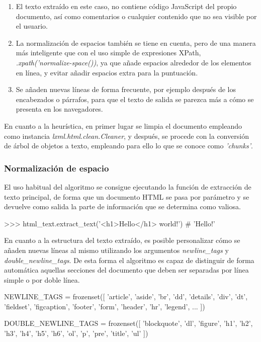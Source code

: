 \begin{enumerate}
  \item El texto extraído en este caso, no contiene código JavaScript del propio documento, así como 
  comentarios o cualquier contenido que no sea visible por el usuario.
  \item La normalización de espacios también se tiene en cuenta, pero de una manera más inteligente que
  con el uso simple de expresiones XPath, \emph{.xpath('normalize-space())}, ya que añade espacios alrededor
  de los elementos en línea, y evitar añadir espacios extra para la puntuación.
  \item Se añaden nuevas líneas de forma frecuente, por ejemplo después de los encabezados o párrafos, para 
  que el texto de salida se parezca más a cómo se presenta en los navegadores.
\end{enumerate}

En cuanto a la heurística, en primer lugar se limpia el documento empleando como instancia
\emph{lxml.html.clean.Cleaner}, y después, se procede con la conversión de árbol de objetos a texto,
empleando para ello lo que se conoce como \emph{'chunks'}.

\subsubsection{Normalización de espacio}
\label{subsubsec:normalizacion de espacio}

El uso habitual del algoritmo se consigue ejecutando la función de extracción de texto principal, de forma 
que un documento HTML se pasa por parámetro y se devuelve como salida la parte de información que se determina
como valiosa.

\begin{Schunk}
  \begin{Soutput}
    >>> html_text.extract_text('<h1>Hello</h1> world!')
    # 'Hello\n\nworld!'
  \end{Soutput}
\end{Schunk}

En cuanto a la estructura del texto extraído, es posible personalizar cómo se añaden nuevas líneas al mismo
utilizando los argumentos \emph{newline\_tags} y \emph{double\_newline\_tags}. De esta forma el algoritmo 
es capaz de distinguir de forma automática aquellas secciones del documento que deben ser separadas por 
línea simple o por doble línea.

\begin{Schunk}
  \begin{Soutput}
    NEWLINE_TAGS = frozenset([
      'article', 'aside', 'br', 'dd', 'details', 'div', 'dt', 'fieldset',
      'figcaption', 'footer', 'form', 'header', 'hr', 'legend', ...
    ])

    DOUBLE_NEWLINE_TAGS = frozenset([
      'blockquote', 'dl', 'figure', 'h1', 'h2', 'h3', 'h4', 'h5', 'h6', 'ol',
      'p', 'pre', 'title', 'ul'
    ])
  \end{Soutput}
\end{Schunk}

